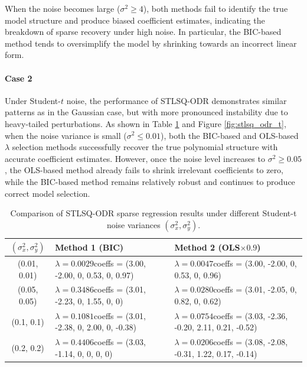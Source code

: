 When the noise becomes large ($\sigma^2 \geq 4$), both methods fail to identify the true model structure and produce biased coefficient estimates, indicating the breakdown of sparse recovery under high noise. In particular, the BIC-based method tends to oversimplify the model by shrinking towards an incorrect linear form.



\paragraph{Case 2}

Under Student-$t$ noise, the performance of STLSQ-ODR demonstrates similar patterns as in the Gaussian case, but with more pronounced instability due to heavy-tailed perturbations. As shown in Table \ref{tab:sparse_noise2} and Figure \ref{fig:stlsq_odr_t}, when the noise variance is small ($\sigma^2 \leq 0.01$), both the BIC-based and OLS-based $\lambda$ selection methods successfully recover the true polynomial structure with accurate coefficient estimates. However, once the noise level increases to $\sigma^2 \geq 0.05$, the OLS-based method already fails to shrink irrelevant coefficients to zero, while the BIC-based method remains relatively robust and continues to produce correct model selection. 

\begin{table}[htbp]
\centering
\caption{Comparison of STLSQ-ODR sparse regression results under different Student-t noise variances $(\sigma_x^2, \sigma_y^2)$.}
\label{tab:sparse_noise2}
\scriptsize
\begin{tabular}{c p{6cm} p{6cm}}
\toprule
$(\sigma_x^2, \sigma_y^2)$ & Method 1 (BIC) & Method 2 (OLS$\times 0.9$) \\
\midrule
(0.01, 0.01) & $\lambda=0.0029$\newline coeffs = (3.00, -2.00, 0, 0.53, 0, 0.97) 
             & $\lambda=0.0047$\newline coeffs = (3.00, -2.00, 0, 0.53, 0, 0.96) \\
\midrule
(0.05, 0.05) & $\lambda=0.3486$\newline coeffs = (3.01, -2.23, 0, 1.55, 0, 0) 
             & $\lambda=0.0280$\newline coeffs = (3.01, -2.05, 0, 0.82, 0, 0.62) \\
\midrule
(0.1, 0.1)   & $\lambda=0.1081$\newline coeffs = (3.01, -2.38, 0, 2.00, 0, -0.38) 
             & $\lambda=0.0754$\newline coeffs = (3.03, -2.36, -0.20, 2.11, 0.21, -0.52) \\
\midrule
(0.2, 0.2)   & $\lambda=0.4406$\newline coeffs = (3.03, -1.14, 0, 0, 0, 0) 
             & $\lambda=0.0206$\newline coeffs = (3.08, -2.08, -0.31, 1.22, 0.17, -0.14) \\
\bottomrule
\end{tabular}
\end{table}


